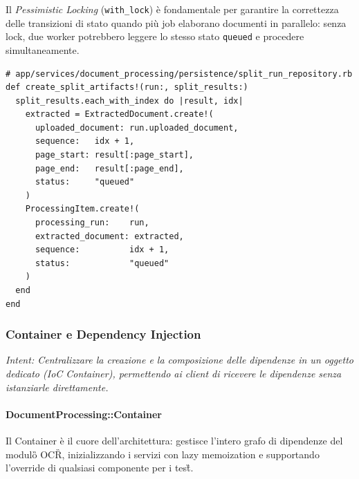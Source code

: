 \documentclass[a4paper,11pt]{article}
\newcommand{\code}[1]{\texttt{#1}}
\newcommand{\pattern}[1]{\textit{#1}}
\begin{document}
Il \pattern{Pessimistic Locking} (\code{with\_lock}) è fondamentale per
garantire la correttezza delle transizioni di stato quando più job elaborano
documenti in parallelo: senza lock, due worker potrebbero leggere lo stesso
stato \code{queued} e procedere simultaneamente.

\begin{lstlisting}[caption={SplitRunRepository -- creazione artefatti di splitting}]
# app/services/document_processing/persistence/split_run_repository.rb
def create_split_artifacts!(run:, split_results:)
  split_results.each_with_index do |result, idx|
    extracted = ExtractedDocument.create!(
      uploaded_document: run.uploaded_document,
      sequence:   idx + 1,
      page_start: result[:page_start],
      page_end:   result[:page_end],
      status:     "queued"
    )
    ProcessingItem.create!(
      processing_run:    run,
      extracted_document: extracted,
      sequence:          idx + 1,
      status:            "queued"
    )
  end
end
\end{lstlisting}

\subsubsection{Container e Dependency Injection}

\textit{Intent: Centralizzare la creazione e la composizione delle dipendenze in un oggetto
dedicato (IoC Container), permettendo ai client di ricevere le
dipendenze senza istanziarle direttamente.}

\paragraph{DocumentProcessing::Container}
Il Container è il cuore dell'architettura: gestisce l'intero grafo di
dipendenze del modulo\G{} OCR\G{}, inizializzando i servizi con lazy memoization
e supportando l'override di qualsiasi componente per i test\G{}.
\end{document}
